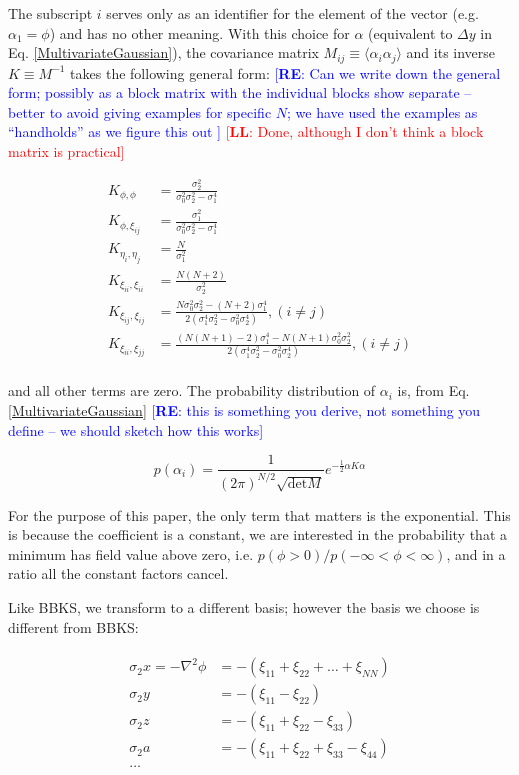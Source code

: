 \documentclass[12pt]{article}
\newcommand{\re}[1]{\textcolor{blue}{[{\bf RE}: #1]}}
\newcommand{\lfl}[1]{\textcolor{red}{[{\bf LL}: #1]}}
\begin{document}
\noindent The subscript $i$ serves only as an identifier for the element of the vector (e.g. $\alpha_1 = \phi$) and has no other meaning. With this choice for $\alpha$ (equivalent to $\Delta y$ in Eq. \ref{MultivariateGaussian}), the covariance matrix $M_{ij}\equiv\langle\alpha_i\alpha_j\rangle$ and its inverse $K \equiv M^{-1}$ takes the following general form: \re{Can we write down the general form; possibly as a block matrix with the individual blocks show separate -- better to avoid giving examples for specific $N$; we have used the examples as ``handholds'' as we figure this out } \lfl{Done, although I don't think a block matrix is practical}

\begin{align*}
K_{\phi, \phi} &= \frac{\sigma_2^2}{\sigma_0^2\sigma_2^2-\sigma_1^4} \\
K_{\phi, \xi_{ij}} &= \frac{\sigma_1^2}{\sigma_0^2\sigma_2^2-\sigma_1^4} \\
K_{\eta_i,\eta_j} &= \frac{N}{\sigma_1^2}\\
K_{\xi_{ii},\xi_{ii}} &=  \frac{N(N+2)}{\sigma_2^2} \\
K_{\xi_{ij}, \xi_{ij}} &= \frac{N\sigma_0^2\sigma_2^2-(N+2)\sigma_1^4}{2(\sigma_1^4\sigma_2^2-\sigma_0^2\sigma_2^4)}, (i\neq j)\\
K_{\xi_{ii}, \xi_{jj}} &= \frac{(N(N+1)-2)\sigma_1^4 - N(N+1)\sigma_0^2\sigma_2^2}{2(\sigma_1^4\sigma_2^2-\sigma_0^2\sigma_2^4)}, (i \neq j)\\
\end{align*}

\noindent and all other terms are zero. The probability distribution of $\alpha_i$ is, from Eq. \ref{MultivariateGaussian} \re{this is something you derive, not something you define -- we should sketch how this works}

\begin{equation} \label{ProbDistrib}
p(\alpha_i)=\frac{1}{(2\pi)^{N/2}\sqrt{\mathrm{det}M}} e^{-\frac{1}{2}\alpha K \alpha}
\end{equation}

For the purpose of this paper, the only term that matters is the exponential. This is because the coefficient is a constant, we are interested in the probability that a minimum has field value above zero, i.e. $p(\phi>0)/p(-\infty<\phi<\infty)$, and in a ratio all the constant factors cancel.

Like BBKS, we transform to a different basis; however the basis we choose is different from BBKS:

\begin{align*}
\begin{split}
\sigma_2x = -\nabla^2\phi &= -(\xi_{11}+\xi_{22}+\ldots+\xi_{NN})\\
\sigma_2y &= -(\xi_{11}-\xi_{22})\\
\sigma_2z &= -(\xi_{11}+\xi_{22}-\xi_{33})\\
\sigma_2a &= -(\xi_{11}+\xi_{22}+\xi_{33}-\xi_{44})\\
\ldots
\end{split}
\end{align*}
\end{document}
